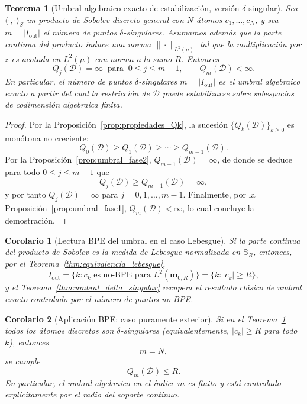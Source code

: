 \documentclass[12pt,a4paper]{article}
\newtheorem{theorem}{Teorema}
\newtheorem{corollary}{Corolario}
\theoremstyle{definition}
\theoremstyle{remark}
\newcommand{\D}{\mathcal{D}}
\begin{document}
\begin{theorem}[Umbral algebraico exacto de estabilización, versión $\delta$-singular]
  \label{thm:umbral_exacto_Qm_nobpe}
  \label{thm:umbral_delta_singular}
  Sea $\langle\cdot,\cdot\rangle_S$ un producto de Sobolev discreto general
  con $N$ átomos $c_1,\dots,c_N$, y sea
  $m=|I_{\mathrm{out}}|$ el número de puntos $\delta$-singulares. Asumamos
  además que la parte continua del producto induce una norma
  $\|\cdot\|_{L^2(\mu)}$ tal que la multiplicación por $z$ es acotada en
  $L^2(\mu)$ con norma a lo sumo $R$. Entonces
  \[
    Q_j(\D)=\infty\ \text{ para }\ 0\le j\le m-1,
    \qquad
    Q_m(\D)<\infty.
  \]
  En particular, el número de puntos $\delta$-singulares $m = |I_{\mathrm{out}}|$ es el umbral algebraico exacto a partir del cual la restricción de $\D$ puede estabilizarse sobre subespacios de codimensión algebraica finita.
\end{theorem}

\begin{proof}
  Por la Proposición~\ref{prop:propiedades_Qk}, la sucesión $\{Q_k(\D)\}_{k\ge0}$ es monótona no creciente:
  \[
    Q_0(\D)\ge Q_1(\D)\ge\cdots\ge Q_{m-1}(\D).
  \]
  Por la Proposición~\ref{prop:umbral_fase2}, $Q_{m-1}(\D)=\infty$, de donde se deduce para todo $0\le j\le m-1$ que
  \[
    Q_j(\D)\ge Q_{m-1}(\D)=\infty,
  \]
  y por tanto $Q_j(\D)=\infty$ para $j=0,1,\dots,m-1$. Finalmente, por la Proposición~\ref{prop:umbral_fase1}, $Q_m(\D)<\infty$, lo cual concluye la demostración.
\end{proof}

\begin{corollary}[Lectura BPE del umbral en el caso Lebesgue]\label{cor:lectura_BPE_lebesgue}
  Si la parte continua del producto de Sobolev es la medida de Lebesgue
  normalizada en $\mathbb{S}_R$, entonces, por el
  Teorema~\ref{thm:equivalencia_lebesgue},
  \[
    I_{\mathrm{out}}=\{k:c_k\text{ es no-BPE para }L^2(\mathbf m_{0;R})\}
    =\{k:|c_k|\ge R\},
  \]
  y el Teorema~\ref{thm:umbral_delta_singular} recupera el resultado
  clásico de umbral exacto controlado por el número de puntos no-BPE.
\end{corollary}

\begin{corollary}[Aplicación BPE: caso puramente exterior]\label{cor:umbral_m_puramente_exterior}
  Si en el Teorema~\ref{thm:umbral_exacto_Qm_nobpe} todos los átomos discretos son $\delta$-singulares (equivalentemente, $|c_k|\ge R$ para todo $k$), entonces
  \[
    m=N,
  \]
  se cumple
  \[
    Q_m(\D)\le R.
  \]
  En particular, el umbral algebraico en el índice $m$ es finito y está controlado explícitamente por el radio del soporte continuo.
\end{corollary}
\end{document}
